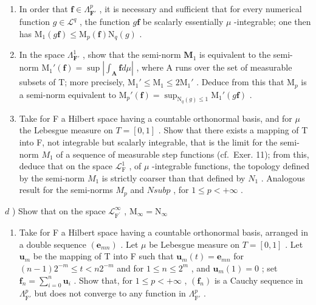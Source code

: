 \begin{enumerate}
\def\labelenumi{\alph{enumi})}
\item
  In order that \(\mathbf{f} \in \Lambda_{\mathbf{F}'}^p\) , it is necessary and sufficient that for every numerical function \(g \in \mathcal{L}^q\) , the function \(g\mathbf{f}\) be scalarly essentially \(\mu\) -integrable; one then has \(\mathrm{M}_1(g\mathbf{f}) \leqslant \mathrm{M}_p(\mathbf{f})\mathrm{N}_q(g)\) .
\item
  In the space \(\Lambda_{\mathbf{F}'}^1\) , show that the semi-norm \(\mathbf{M}_1\) is equivalent to the semi-norm \(\mathrm{M}_1'(\mathbf{f}) = \sup |\int_{\mathbf{A}} \mathbf{f} d\mu|\) , where A runs over the set of measurable subsets of T; more precisely, \(\mathrm{M}_1' \leqslant \mathrm{M}_1 \leqslant 2\mathrm{M}_1'\) . Deduce from this that \(\mathrm{M}_p\) is a semi-norm equivalent to \(\mathrm{M}_p'(\mathbf{f}) = \sup_{\mathrm{N}_q(g) \leqslant 1} \mathrm{M}_1'(g\mathbf{f})\) .
\item
  Take for F a Hilbert space having a countable orthonormal basis, and for \(\mu\) the Lebesgue measure on \(T = [0,1]\) . Show that there exists a mapping of T into F, not integrable but scalarly integrable, that is the limit for the semi-norm \(M_1\) of a sequence of measurable step functions (cf.~Exer. 11); from this, deduce that on the space \(\mathcal{L}_{\mathrm{F}}^1\) , of \(\mu\) -integrable functions, the topology defined by the semi-norm \(M_1\) is strictly coarser than that defined by \(N_1\) . Analogous result for the semi-norms \(M_p\) and \(N sub p\) , for \(1 \leqslant p < +\infty\) .
\end{enumerate}

\(d\) ) Show that on the space \(\mathcal{L}_{\mathrm{F}^{\prime}}^{\infty}\) , \(\mathrm{M}_{\infty} = \mathrm{N}_{\infty}\)

\begin{enumerate}
\def\labelenumi{\alph{enumi})}
\setcounter{enumi}{4}
\tightlist
\item
  Take for F a Hilbert space having a countable orthonormal basis, arranged in a double sequence \((\mathbf{e}_{mn})\) . Let \(\mu\) be Lebesgue measure on \(T = [0,1]\) . Let \(\mathbf{u}_m\) be the mapping of T into F such that \(\mathbf{u}_m(t) = \mathbf{e}_{mn}\) for \((n - 1)2^{-m} \leqslant t < n2^{-m}\) and for \(1 \leqslant n \leqslant 2^m\) , and \(\mathbf{u}_m(1) = 0\) ; set \(\mathbf{f}_n = \sum_{i=0}^{n} \mathbf{u}_i\) . Show that, for \(1 \leqslant p < +\infty\) , \((\mathbf{f}_n)\) is a Cauchy sequence in \(\Lambda_{\mathrm{F}'}^p\) but does not converge to any function in \(\Lambda_{\mathrm{F}'}^p\) .
\end{enumerate}

